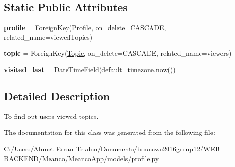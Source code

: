 \subsection*{Static Public Attributes}
\begin{DoxyCompactItemize}
\item 
\hypertarget{class_meanco_app_1_1models_1_1profile_1_1_viewed_topic_a85144be71c23fd1fe693e6624439f155}{}\label{class_meanco_app_1_1models_1_1profile_1_1_viewed_topic_a85144be71c23fd1fe693e6624439f155} 
{\bfseries profile} = Foreign\+Key(\hyperlink{class_meanco_app_1_1models_1_1profile_1_1_profile}{Profile}, on\+\_\+delete=C\+A\+S\+C\+A\+DE, related\+\_\+name=\textquotesingle{}viewed\+Topics\textquotesingle{})
\item 
\hypertarget{class_meanco_app_1_1models_1_1profile_1_1_viewed_topic_afeaa487ebc6a4fc4af4ee0fc1d36a8ab}{}\label{class_meanco_app_1_1models_1_1profile_1_1_viewed_topic_afeaa487ebc6a4fc4af4ee0fc1d36a8ab} 
{\bfseries topic} = Foreign\+Key(\hyperlink{class_meanco_app_1_1models_1_1topic_1_1_topic}{Topic}, on\+\_\+delete=C\+A\+S\+C\+A\+DE, related\+\_\+name=\textquotesingle{}viewers\textquotesingle{})
\item 
\hypertarget{class_meanco_app_1_1models_1_1profile_1_1_viewed_topic_aabc219c72352af90aaa430733106a6f7}{}\label{class_meanco_app_1_1models_1_1profile_1_1_viewed_topic_aabc219c72352af90aaa430733106a6f7} 
{\bfseries visited\+\_\+last} = Date\+Time\+Field(default=timezone.\+now())
\end{DoxyCompactItemize}


\subsection{Detailed Description}
To find out users viewed topics. 

The documentation for this class was generated from the following file\+:\begin{DoxyCompactItemize}
\item 
C\+:/\+Users/\+Ahmet Ercan Tekden/\+Documents/bounswe2016group12/\+W\+E\+B-\/\+B\+A\+C\+K\+E\+N\+D/\+Meanco/\+Meanco\+App/models/profile.\+py\end{DoxyCompactItemize}
